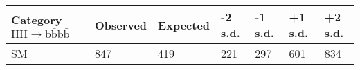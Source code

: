 \documentclass[border=5pt]{standalone}
\begin{document}
  \minipage{18cm}

  \centering
  \small
  
  \begin{tabular}{l l l l l l l}
   \hline
   Category $\textrm{HH}  \rightarrow
  \textrm{b}\bar{\textrm{b}}\textrm{b}\bar{\textrm{b}}$  & Observed & Expected &
   -2 s.d. & -1 s.d. & +1 s.d. & +2 s.d. \\
   \hline
SM $$ &   847 &   419  &   221  &   297  &   601  &   834  \\
   \hline
 \end{tabular}

  \endminipage
\end{document}
